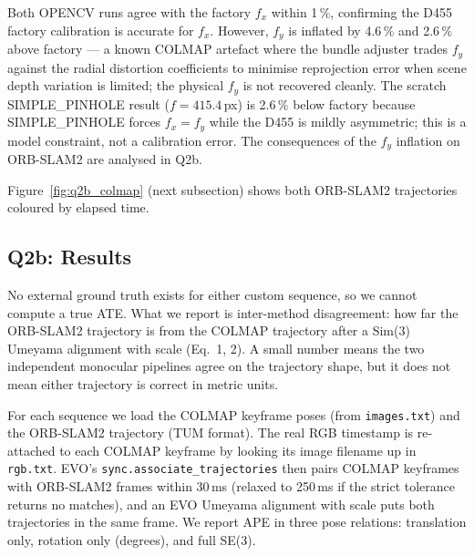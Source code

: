 \documentclass[twocolumn,10pt,a4paper]{article}
\begin{document}
\begin{table}[H]
\centering\scriptsize
\caption{Q2a COLMAP self-calibration vs.\ factory D455 intrinsics.}
\label{tab:q2a_calib}
\end{table}

Both OPENCV runs agree with the factory $f_x$ within 1\,\%,
confirming the D455 factory calibration is accurate for $f_x$.
However, $f_y$ is inflated by 4.6\,\% and 2.6\,\% above factory
--- a known COLMAP artefact where the bundle adjuster trades $f_y$
against the radial distortion coefficients to minimise reprojection
error when scene depth variation is limited; the physical $f_y$ is
not recovered cleanly. The scratch SIMPLE\_PINHOLE result
($f = 415.4$\,px) is 2.6\,\% below factory because SIMPLE\_PINHOLE
forces $f_x = f_y$ while the D455 is mildly asymmetric; this is a
model constraint, not a calibration error. The consequences of the
$f_y$ inflation on ORB-SLAM2 are analysed in Q2b.

Figure~\ref{fig:q2b_colmap} (next subsection) shows both ORB-SLAM2
trajectories coloured by elapsed time.

\subsection{Q2b: Results}
\label{sec:q2b}

No external ground truth exists for either custom sequence, so we
cannot compute a true ATE. What we report is inter-method
disagreement: how far the ORB-SLAM2 trajectory is from the COLMAP
trajectory after a Sim(3) Umeyama alignment with scale (Eq.~1, 2).
A small number means the two independent monocular pipelines agree on
the trajectory shape, but it does not mean either trajectory is
correct in metric units.

For each sequence we load the COLMAP keyframe poses (from
\texttt{images.txt}) and the ORB-SLAM2 trajectory (TUM format). The
real RGB timestamp is re-attached to each COLMAP keyframe by looking
its image filename up in \texttt{rgb.txt}. EVO's
\texttt{sync.associate\_trajectories} then pairs COLMAP keyframes
with ORB-SLAM2 frames within 30\,ms (relaxed to 250\,ms if the
strict tolerance returns no matches), and an EVO Umeyama alignment
with scale puts both trajectories in the same frame. We report APE
in three pose relations: translation only, rotation only (degrees),
and full SE(3).
\end{document}
